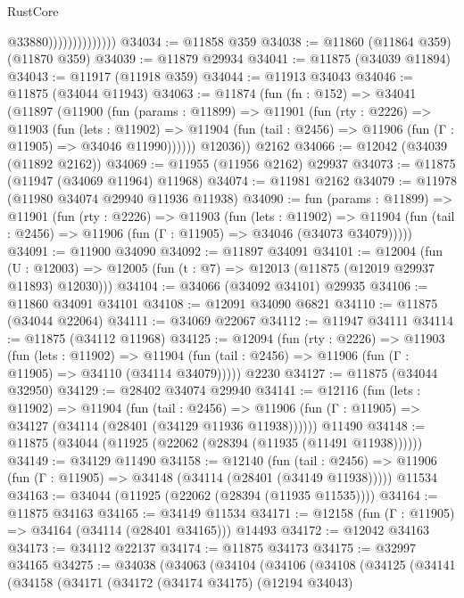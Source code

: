 \begin{lexlean}{RustCore}
\begin{coremodule}
                                @33880))))))))))))))
@34034 := @11858 @359
@34038 := @11860 (@11864 @359) (@11870 @359)
@34039 := @11879 @29934
@34041 := @11875 (@34039 @11894)
@34043 := @11917 (@11918 @359)
@34044 := @11913 @34043
@34046 := @11875 (@34044 @11943)
@34063 := @11874
    (fun (fn : @152) =>
    @34041
      (@11897
        (@11900
          (fun (params : @11899) =>
          @11901
            (fun (rty : @2226) =>
            @11903
              (fun (lets : @11902) =>
              @11904 (fun (tail : @2456) => @11906 (fun (Γ : @11905) => @34046 @11990))))))
        @12036))
    @2162
@34066 := @12042 (@34039 (@11892 @2162))
@34069 := @11955 (@11956 @2162) @29937
@34073 := @11875 (@11947 (@34069 @11964) @11968)
@34074 := @11981 @2162
@34079 := @11978 (@11980 @34074 @29940 @11936 @11938)
@34090 := fun (params : @11899) =>
  @11901
    (fun (rty : @2226) =>
    @11903
      (fun (lets : @11902) =>
      @11904 (fun (tail : @2456) => @11906 (fun (Γ : @11905) => @34046 (@34073 @34079)))))
@34091 := @11900 @34090
@34092 := @11897 @34091
@34101 := @12004
    (fun (U : @12003) => @12005 (fun (t : @7) => @12013 (@11875 (@12019 @29937 @11893) @12030)))
@34104 := @34066 (@34092 @34101) @29935
@34106 := @11860 @34091 @34101
@34108 := @12091 @34090 @6821
@34110 := @11875 (@34044 @22064)
@34111 := @34069 @22067
@34112 := @11947 @34111
@34114 := @11875 (@34112 @11968)
@34125 := @12094
    (fun (rty : @2226) =>
    @11903
      (fun (lets : @11902) =>
      @11904 (fun (tail : @2456) => @11906 (fun (Γ : @11905) => @34110 (@34114 @34079)))))
    @2230
@34127 := @11875 (@34044 @32950)
@34129 := @28402 @34074 @29940
@34141 := @12116
    (fun (lets : @11902) =>
    @11904
      (fun (tail : @2456) =>
      @11906 (fun (Γ : @11905) => @34127 (@34114 (@28401 (@34129 @11936 @11938))))))
    @11490
@34148 := @11875 (@34044 (@11925 (@22062 (@28394 (@11935 (@11491 @11938))))))
@34149 := @34129 @11490
@34158 := @12140
    (fun (tail : @2456) => @11906 (fun (Γ : @11905) => @34148 (@34114 (@28401 (@34149 @11938)))))
    @11534
@34163 := @34044 (@11925 (@22062 (@28394 (@11935 @11535))))
@34164 := @11875 @34163
@34165 := @34149 @11534
@34171 := @12158 (fun (Γ : @11905) => @34164 (@34114 (@28401 @34165))) @14493
@34172 := @12042 @34163
@34173 := @34112 @22137
@34174 := @11875 @34173
@34175 := @32997 @34165
@34275 := @34038
    (@34063
      (@34104
        (@34106
          (@34108
            (@34125
              (@34141
                (@34158
                  (@34171
                    (@34172
                      (@34174 @34175)
                      (@12194 @34043)

\end{coremodule}
\end{lexlean}
